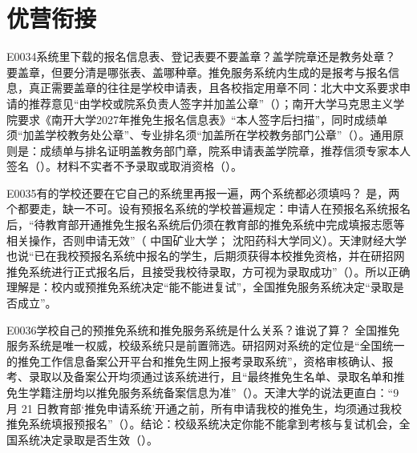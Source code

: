 \section{优营衔接}
\begin{qa}{E0034}{系统里下载的报名信息表、登记表要不要盖章？盖学院章还是教务处章？}
要盖章，但要分清是哪张表、盖哪种章。推免服务系统内生成的是报考与报名信息，真正需要盖章的往往是学校申请表，且各校指定用章不同：北大中文系要求申请的推荐意见“由学校或院系负责人签字并加盖公章”（）；南开大学马克思主义学院要求《南开大学2027年推免生报名信息表》“本人签字后扫描”，同时成绩单须“加盖学校教务处公章”、专业排名须“加盖所在学校教务部门公章”（）。通用原则是：成绩单与排名证明盖教务部门章，院系申请表盖学院章，推荐信须专家本人签名（）。材料不实者不予录取或取消资格（）。
\end{qa}

\begin{qa}{E0035}{有的学校还要在它自己的系统里再报一遍，两个系统都必须填吗？}
是，两个都要走，缺一不可。设有预报名系统的学校普遍规定：申请人在预报名系统报名后，“待教育部开通推免生报名系统后仍须在教育部的推免系统中完成填报志愿等相关操作，否则申请无效”（ 中国矿业大学； 沈阳药科大学同义）。天津财经大学也说“已在我校预报名系统中报名的学生，后期须获得本校推免资格，并在研招网推免系统进行正式报名后，且接受我校待录取，方可视为录取成功”（）。所以正确理解是：校内或预推免系统决定“能不能进复试”，全国推免服务系统决定“录取是否成立”。
\end{qa}

\begin{qa}{E0036}{学校自己的预推免系统和推免服务系统是什么关系？谁说了算？}
全国推免服务系统是唯一权威，校级系统只是前置筛选。研招网对系统的定位是“全国统一的推免工作信息备案公开平台和推免生网上报考录取系统”，资格审核确认、报考、录取以及备案公开均须通过该系统进行，且“最终推免生名单、录取名单和推免生学籍注册均以推免服务系统备案信息为准”（）。天津大学的说法更直白：“9 月 21 日教育部‘推免申请系统’开通之前，所有申请我校的推免生，均须通过我校推免系统填报预报名”（）。结论：校级系统决定你能不能拿到考核与复试机会，全国系统决定录取是否生效（）。
\end{qa}

